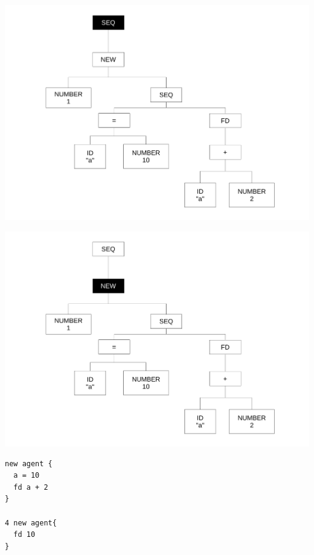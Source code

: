 
\begin{frame}
\includegraphics[scale=0.3]{doc/Presentation/img/arbre1.pdf}
\end{frame}

\begin{frame}
\includegraphics[scale=0.3]{doc/Presentation/img/arbre2.pdf}
\end{frame}

\begin{frame}[fragile]
	\begin{lstlisting}[language=Stibbons]
new agent {
  a = 10
  fd a + 2
}

4 new agent{
  fd 10
}
	\end{lstlisting}
\end{frame}

